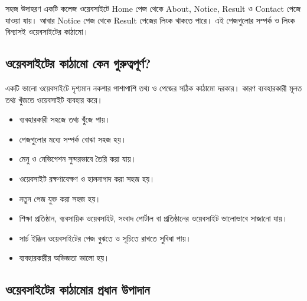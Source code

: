 \begin{examplebox}{সহজ উদাহরণ}
একটি কলেজ ওয়েবসাইটে Home পেজ থেকে About, Notice, Result ও Contact পেজে যাওয়া যায়। আবার Notice পেজ থেকে Result পেজের লিংক থাকতে পারে। এই পেজগুলোর সম্পর্ক ও লিংক বিন্যাসই ওয়েবসাইটের কাঠামো।
\end{examplebox}

\subsection{ওয়েবসাইটের কাঠামো কেন গুরুত্বপূর্ণ?}

একটি ভালো ওয়েবসাইটে দৃশ্যমান নকশার পাশাপাশি তথ্য ও পেজের সঠিক কাঠামো দরকার। কারণ ব্যবহারকারী মূলত তথ্য খুঁজতে ওয়েবসাইট ব্যবহার করে।

\par\noindent
\begin{minipage}[t]{.48\linewidth}\vspace{0pt}
\begin{itemize}
\item ব্যবহারকারী সহজে তথ্য খুঁজে পায়।
\item পেজগুলোর মধ্যে সম্পর্ক বোঝা সহজ হয়।
\item মেনু ও নেভিগেশন সুন্দরভাবে তৈরি করা যায়।
\item ওয়েবসাইট রক্ষণাবেক্ষণ ও হালনাগাদ করা সহজ হয়।
\end{itemize}
\end{minipage}\hfill
\begin{minipage}[t]{.48\linewidth}\vspace{0pt}
\begin{itemize}
\item নতুন পেজ যুক্ত করা সহজ হয়।
\item শিক্ষা প্রতিষ্ঠান, ব্যবসায়িক ওয়েবসাইট, সংবাদ পোর্টাল বা প্রতিষ্ঠানের ওয়েবসাইট ভালোভাবে সাজানো যায়।
\item সার্চ ইঞ্জিন ওয়েবসাইটের পেজ বুঝতে ও সূচিতে রাখতে সুবিধা পায়।
\item ব্যবহারকারীর অভিজ্ঞতা ভালো হয়।
\end{itemize}
\end{minipage}\par


\subsection{ওয়েবসাইটের কাঠামোর প্রধান উপাদান}

